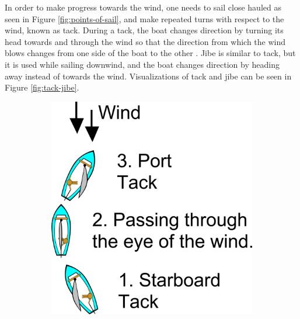 \documentclass[12pt,twoside]{report}
\begin{document}
In order to make progress towards the wind, one needs to sail close hauled as seen in Figure \ref{fig:points-of-sail}, and make repeated turns with respect to the wind, known as tack. During a tack, the boat changes direction by turning its head towards and through the wind so that the direction from which the wind blows changes from one side of the boat to the other \cite{wiki:tack}. Jibe is similar to tack, but it is used while sailing downwind, and the boat changes direction by heading away instead of towards the wind. Visualizations of tack and jibe can be seen in Figure \ref{fig:tack-jibe}. 

\begin{figure}[h]
    \centering
    \begin{subfigure}[b]{0.28\textwidth}
        \centering
        \includegraphics[width=\textwidth]{figures/sailing/tack.png}
        \label{fig:tack}
    \end{subfigure}
    \begin{subfigure}[b]{0.22\textwidth}
        \centering

\end{subfigure}
\end{figure}
\end{document}
